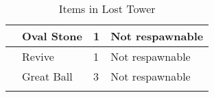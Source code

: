 \begin{longtable}{|| l l l l ||}%
\hline%
&Oval Stone&1&Not respawnable\\%
\hline%
&Revive&1&Not respawnable\\%
\hline%
&Great Ball&3&Not respawnable\\%
\hline%
\endhead%
\hline%
\caption{Items in Lost Tower}%
\label{tab:LostTowerItems}%
\end{longtable}